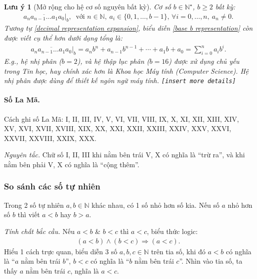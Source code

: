 \documentclass{article}
\numberwithin{equation}{section}
\newtheorem{remark}{Lưu ý}[section]
\begin{document}
\begin{remark}[Mở rộng cho hệ cơ số nguyên bất kỳ]
	Cơ số $b\in\mathbb{N}^\star$, $b\ge 2$ bất kỳ:
	\begin{align}
		\label{base b representation}
		\overline{a_na_{n-1}\ldots a_1a_0}|_{b},\ \mbox{ với } n\in\mathbb{N},\ a_i\in\{0,1,\ldots,b - 1\},\,\forall i = 0,\ldots,n,\ a_n\ne 0.
	\end{align}
	Tương tự \eqref{decimal representation expansion}, biểu diễn \eqref{base b representation} còn được viết cụ thể hơn dưới dạng tổng là:
	\begin{align}
		\label{base b representation expansion}
		\overline{a_na_{n-1}\ldots a_1a_0}|_{b} = a_nb^n + a_{n-1}b^{n-1} + \cdots + a_1b + a_0 = \sum_{i=0}^n a_ib^i.
	\end{align}
	E.g., hệ nhị phân ($b = 2$), và hệ thập lục phân ($b = 16$) được xử dụng chủ yếu trong Tin học, hay chính xác hơn là Khoa học Máy tính (Computer Science). Hệ nhị phân được dùng để thiết kế ngôn ngữ máy tính. \texttt{[insert more details]}
\end{remark}

\paragraph{Số La Mã.} Cách ghi số La Mã: I, II, III, IV, V, VI, VII, VIII, IX, X, XI, XII, XIII, XIV, XV, XVI, XVII, XVIII, XIX, XX, XXI, XXII, XXIII, XXIV, XXV, XXVI, XXVII, XXVIII, XXIX, XXX.

\textit{Nguyên tắc.} Chữ số I, II, III khi nằm bên trái V, X có nghĩa là ``trừ ra'', và khi nằm bên phải V, X có nghĩa là ``cộng thêm''.

\subsubsection{So sánh các số tự nhiên}
Trong 2 số tự nhiên $a,b\in\mathbb{N}$ khác nhau, có 1 số nhỏ hơn số kia. Nếu số $a$ nhỏ hơn số $b$ thì viết $a < b$ hay $b > a$.

\textit{Tính chất bắc cầu.} Nếu $a < b$ \& $b < c$ thì $a < c$, biểu thức logic:
\begin{align*}
	(a < b)\land(b < c)\Rightarrow(a < c).
\end{align*}
Hiểu 1 cách trực quan, biểu diễn 3 số $a,b,c\in\mathbb{N}$ trên tia số, khi đó $a < b$ có nghĩa là ``$a$ nằm bên trái $b$'', $b < c$ có nghĩa là ``$b$ nằm bên trái $c$''. Nhìn vào tia số, ta thấy $a$ nằm bên trái $c$, nghĩa là $a < c$.
\end{document}

